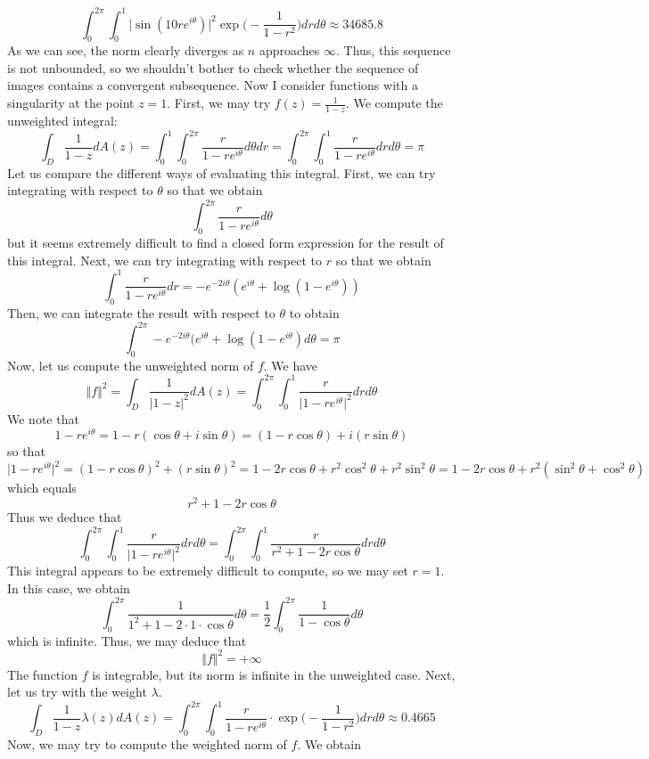 \documentclass[12pt]{article}
\begin{document}
\[
\int_0^{2\pi} \int_0^1 \vert \sin(10re^{i\theta}) \vert^2 \exp\bigg(-\frac{1}{1-r^2}\bigg) dr d\theta \approx 34685.8
\] As we can see, the norm clearly diverges as $n$ approaches $\infty$. Thus, this sequence is not unbounded, so we shouldn't bother to check whether the sequence of images contains a convergent subsequence. Now I consider functions with a singularity at the point $z = 1$. First, we may try $f(z) = \frac{1}{1-z}$. We compute the unweighted integral:
\[
\int_D \frac{1}{1-z} dA(z) = \int_0^1 \int_0^{2\pi} \frac{r}{1-re^{i\theta}} d\theta dr = \int_0^{2\pi} \int_0^1 \frac{r}{1-re^{i\theta}} dr d\theta = \pi
\] Let us compare the different ways of evaluating this integral. First, we can try integrating with respect to $\theta$ so that we obtain
\[
\int_0^{2\pi} \frac{r}{1-re^{i\theta}} d\theta
\] but it seems extremely difficult to find a closed form expression for the result of this integral. Next, we can try integrating with respect to $r$ so that we obtain
\[
\int_0^1 \frac{r}{1-re^{i\theta}} dr = -e^{-2i \theta}(e^{i\theta} + \log(1 - e^{i\theta}))
\] Then, we can integrate the result with respect to $\theta$ to obtain
\[
\int_0^{2\pi} -e^{-2i \theta}(e^{i\theta} + \log(1 - e^{i\theta}) d \theta = \pi
\] Now, let us compute the unweighted norm of $f$. We have
\[
\Vert f \Vert^2 = \int_D \frac{1}{\vert 1- z \vert^2} dA(z) = \int_0^{2\pi} \int_0^1 \frac{r}{\vert 1 - re^{i\theta} \vert^2} dr d \theta 
\] We note that
\[
1 - re^{i\theta} = 1 - r(\cos \theta + i \sin \theta) = (1-r \cos \theta) + i(r \sin \theta)
\] so that
\[
\vert 1 - re^{i\theta} \vert^2 = (1-r\cos \theta)^2 + (r\sin \theta)^2 = 1 - 2r \cos \theta + r^2 \cos^2 \theta + r^2 \sin^2 \theta = 1 - 2r\cos \theta + r^2(\sin^2 \theta + \cos^2 \theta)
\] which equals
\[
r^2 + 1 - 2r \cos \theta
\] Thus we deduce that
\[
\int_0^{2\pi} \int_0^1 \frac{r}{\vert 1 - re^{i\theta} \vert^2} dr d \theta = \int_0^{2\pi} \int_0^1 \frac{r}{r^2 +1 - 2r \cos \theta} dr d \theta  
\] This integral appears to be extremely difficult to compute, so we may set $r = 1$. In this case, we obtain
\[
\int_0^{2\pi} \frac{1}{1^2 +1 - 2 \cdot 1 \cdot \cos \theta} d \theta = \frac{1}{2} \int_0^{2\pi} \frac{1}{1 - \cos \theta} d\theta
\] which is infinite. Thus, we may deduce that
\[
\Vert f \Vert^2 = +\infty
\]
The function $f$ is integrable, but its norm is infinite in the unweighted case. Next, let us try with the weight $\lambda$.
\[
\int_D \frac{1}{1-z} \lambda(z) dA(z) = \int_0^{2\pi} \int_0^1 \frac{r}{1-re^{i\theta}}\cdot \exp\bigg(-\frac{1}{1-r^2}\bigg) dr d\theta \approx 0.4665
\] Now, we may try to compute the weighted norm of $f$. We obtain
\end{document}
